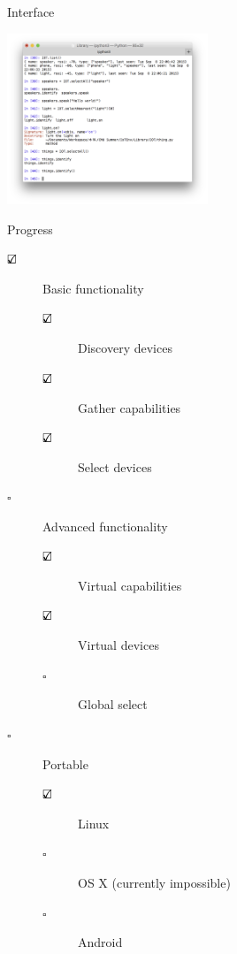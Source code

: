 \documentclass[a0paper,portrait]{baposter}
\begin{document}
\begin{poster}
\begin{posterbox}[name=interface,span=2,column=2,below=proto]{Interface}
\begin{center}
  \includegraphics[width=60mm]{command}
  \vspace*{-0.8cm}
  \label{fig:command}
\end{center}


\end{posterbox}
\newcommand{\nbox}{$\square$}
\newcommand{\cbox}{$\text{\rlap{$\checkmark$}}\square$}
\begin{posterbox}[name=progress,column=4,span=1,below=proto]{Progress}
\begin{description}
  \item[\cbox] Basic functionality
    \begin{description}
      \item[\cbox] Discovery devices
      \item[\cbox] Gather capabilities
      \item[\cbox] Select devices
    \end{description}
  \item[\nbox] Advanced functionality
    \begin{description}
      \item[\cbox] Virtual capabilities
      \item[\cbox] Virtual devices
      \item[\nbox] Global select
    \end{description}
  \item[\nbox] Portable
    \begin{description}
      \item[\cbox] Linux
      \item[\nbox] OS X (currently impossible)
      \item[\nbox] Android
    \end{description}
\end{description}
\end{posterbox}


\end{poster}
\end{document}

